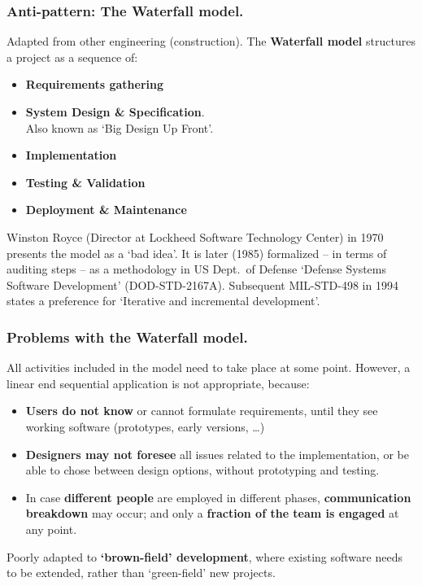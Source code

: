 \documentclass{beamer} %
\newcommand\emc[1]{\textcolor{midred}{\textbf{#1}}}
\begin{document}
\begin{frame}
\frametitle{Anti-pattern: The Waterfall model.}

Adapted from other engineering (construction). The \emc{Waterfall model} structures a project as a sequence of:
\begin{itemize}
\item \emc{Requirements gathering}
\item \emc{System Design \& Specification}. \\ Also known as `Big Design Up Front'.
\item \emc{Implementation}
\item \emc{Testing \& Validation}
\item \emc{Deployment \& Maintenance}
\end{itemize}

\begin{block}{}
\small Winston Royce (Director at Lockheed Software Technology Center) in 1970 presents the model as a `bad idea'. It is later (1985) formalized -- in terms of auditing steps -- as a methodology in US Dept.\ of Defense `Defense Systems Software Development' (DOD-STD-2167A). Subsequent MIL-STD-498 in 1994 states a preference for `Iterative and incremental development'.
\end{block}

\end{frame}

\begin{frame}
\frametitle{Problems with the Waterfall model.}

All activities included in the model need to take place at some point. However, a linear end sequential application is not appropriate, because:
\begin{itemize}
  \item \emc{Users do not know} or cannot formulate requirements, until they see working software (prototypes, early versions, \ldots)
  \item \emc{Designers may not foresee} all issues related to the implementation, or be able to chose between design options, without prototyping and testing.
  \item In case \emc{different people} are employed in different phases, \emc{communication breakdown} may occur; and only a \emc{fraction of the team is engaged} at any point.
\end{itemize}

Poorly adapted to \emc{`brown-field' development}, where existing software needs to be extended, rather than `green-field' new projects.

\end{frame}
\end{document}
